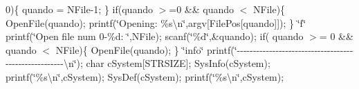 0)\{ quando = N\+File-\/1; \} if(quando $>$=0 \&\& quando $<$ N\+File)\{ Open\+File(quando); printf(\char`\"{}\+Opening\+: \%s\textbackslash{}n\char`\"{},argv\mbox{[}File\+Pos\mbox{[}quando\mbox{]}\mbox{]}); \} \char`\"{}f\char`\"{} printf(\char`\"{}\+Open file num 0-\/\%d\+: \char`\"{},N\+File); scanf(\char`\"{}\%d\char`\"{},\&quando); if( quando $>$= 0 \&\& quando $<$ N\+File)\{ Open\+File(quando); \} \char`\"{}info\char`\"{} printf(\char`\"{}-\/-\/-\/-\/-\/-\/-\/-\/-\/-\/-\/-\/-\/-\/-\/-\/-\/-\/-\/-\/-\/-\/-\/-\/-\/-\/-\/-\/-\/-\/-\/-\/-\/-\/-\/-\/-\/-\/-\/-\/-\/-\/-\/-\/-\/-\/-\/-\/-\/-\/-\/-\/-\/-\/\textbackslash{}n\char`\"{}); char c\+System\mbox{[}S\+T\+R\+S\+I\+ZE\mbox{]}; Sys\+Info(c\+System); printf(\char`\"{}\%s\textbackslash{}n\char`\"{},c\+System); Sys\+Def(c\+System); printf(\char`\"{}\%s\textbackslash{}n\char`\"{},c\+System);


